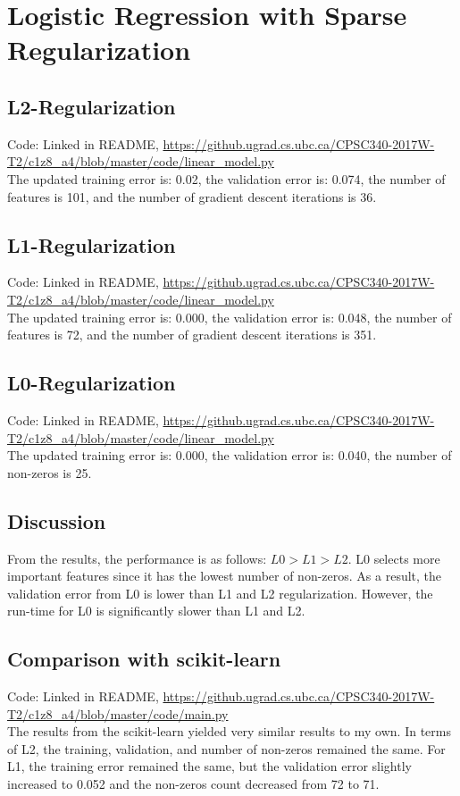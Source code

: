 \documentclass{article}
\def\blu#1{{\color{blu}#1}}
\begin{document}
\section{Logistic Regression with Sparse Regularization}

\subsection{L2-Regularization}
Code: Linked in README, \url{https://github.ugrad.cs.ubc.ca/CPSC340-2017W-T2/c1z8_a4/blob/master/code/linear_model.py} \\
\blu{The updated training error is: 0.02, the validation error is: 0.074, the number of features is 101, and the number of gradient descent iterations is 36.}

\subsection{L1-Regularization}

Code: Linked in README, \url{https://github.ugrad.cs.ubc.ca/CPSC340-2017W-T2/c1z8_a4/blob/master/code/linear_model.py} \\
\blu{The updated training error is: 0.000, the validation error is: 0.048, the number of features is 72, and the number of gradient descent iterations is 351.}

\subsection{L0-Regularization}

Code: Linked in README, \url{https://github.ugrad.cs.ubc.ca/CPSC340-2017W-T2/c1z8_a4/blob/master/code/linear_model.py} \\
\blu{The updated training error is: 0.000, the validation error is: 0.040, the number of non-zeros is 25.}


\subsection{Discussion}

\blu{From the results, the performance is as follows: $L0 > L1 > L2$. L0 selects more important features since it has the lowest number of non-zeros. As a result, the validation error from L0 is lower than L1 and L2 regularization. However, the run-time for L0 is significantly slower than L1 and L2.}


\subsection{Comparison with scikit-learn}
Code: Linked in README, \url{https://github.ugrad.cs.ubc.ca/CPSC340-2017W-T2/c1z8_a4/blob/master/code/main.py} \\
\blu{The results from the scikit-learn yielded very similar results to my own. In terms of L2, the training, validation, and number of non-zeros remained the same. For L1, the training error remained the same, but the validation error slightly increased to 0.052 and the non-zeros count decreased from 72 to 71.}
\end{document}
